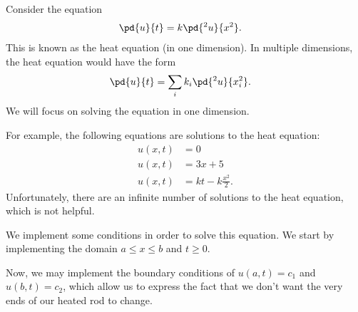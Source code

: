 \documentclass[10pt]{mypackage}
\begin{document}
\begin{example}
  Consider the equation
    \begin{align*}
      \pd{u}{t} &= k \pd{^2u}{x^2}.
    \end{align*}
    This is known as the heat equation (in one dimension). In multiple dimensions, the heat equation would have the form
    \begin{align*}
      \pd{u}{t} &= \sum_{i} k_i\pd{^2u}{x_i^2}.
    \end{align*}
    We will focus on solving the equation in one dimension.\newline

    For example, the following equations are solutions to the heat equation:
    \begin{align*}
      u\left( x,t \right) &= 0\\
      u\left( x,t \right) &= 3x + 5\\
      u\left( x,t \right) &= kt - k\frac{x^2}{2}.
    \end{align*}
    Unfortunately, there are an infinite number of solutions to the heat equation, which is not helpful.\newline

    We implement some conditions in order to solve this equation. We start by implementing the domain $a\leq x \leq b$ and $t\geq 0$.\newline

    Now, we may implement the boundary conditions of $u\left( a,t \right) = c_1$ and $u\left( b,t \right) = c_2$, which allow us to express the fact that we don't want the very ends of our heated rod to change.
\end{example}
\end{document}
